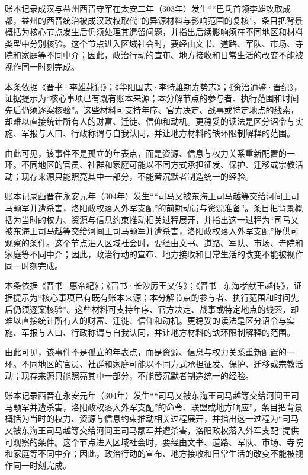 账本记录成汉与益州西晋守军在太安二年（303年）发生““巴氐首领李雄攻取成都，益州的西晋统治被成汉政权取代”的异源材料与影响范围的复核”。条目把背景概括为核心节点发生后仍须处理其遗留问题，并指出后续影响须在不同地区和材料类型中分别核验。这个节点进入区域社会时，要经由文书、道路、军队、市场、寺院和家庭等不同中介；因此，政治行动的宣布、地方接收和日常生活的改变不能被视作同一时刻完成。

本条依据《晋书·李雄载记》；《华阳国志·李特雄期寿势志》；《资治通鉴·晋纪》，证据提示为“核心事项已有既有账本来源；本分解节点的参与者、执行范围和时间先后仍须逐案核验”。这些材料可支持年序、官方决定、战事或特定地点的线索，却难以直接统计所有人的财富、迁徙、信仰和动机。更稳妥的读法是区分诏令与实施、军报与人口、行政称谓与自我认同，并让地方材料的缺环限制解释的范围。

由此可见，该事件不是孤立的年表点，而是资源、信息与权力关系重新配置的一环。不同地区的官员、社群和家庭可能以不同方式承担征发、保护、迁移或宗教活动；现存来源只能照亮其中一部分，不能替沉默者制造统一的经验。

账本记录西晋在永安元年（304年）发生““司马乂被东海王司马越等交给河间王司马颙军并遭杀害，洛阳政权落入外军支配”的前期动员与资源准备”。条目把背景概括为当时的权力、资源与信息约束推动相关过程展开，并指出这一过程为“司马乂被东海王司马越等交给河间王司马颙军并遭杀害，洛阳政权落入外军支配”提供可观察的条件。这个节点进入区域社会时，要经由文书、道路、军队、市场、寺院和家庭等不同中介；因此，政治行动的宣布、地方接收和日常生活的改变不能被视作同一时刻完成。

本条依据《晋书·惠帝纪》；《晋书·长沙厉王乂传》；《晋书·东海孝献王越传》，证据提示为“核心事项已有既有账本来源；本分解节点的参与者、执行范围和时间先后仍须逐案核验”。这些材料可支持年序、官方决定、战事或特定地点的线索，却难以直接统计所有人的财富、迁徙、信仰和动机。更稳妥的读法是区分诏令与实施、军报与人口、行政称谓与自我认同，并让地方材料的缺环限制解释的范围。

由此可见，该事件不是孤立的年表点，而是资源、信息与权力关系重新配置的一环。不同地区的官员、社群和家庭可能以不同方式承担征发、保护、迁移或宗教活动；现存来源只能照亮其中一部分，不能替沉默者制造统一的经验。

账本记录西晋在永安元年（304年）发生““司马乂被东海王司马越等交给河间王司马颙军并遭杀害，洛阳政权落入外军支配”的命令、联盟或地方响应”。条目把背景概括为当时的权力、资源与信息约束推动相关过程展开，并指出这一过程为“司马乂被东海王司马越等交给河间王司马颙军并遭杀害，洛阳政权落入外军支配”提供可观察的条件。这个节点进入区域社会时，要经由文书、道路、军队、市场、寺院和家庭等不同中介；因此，政治行动的宣布、地方接收和日常生活的改变不能被视作同一时刻完成。

